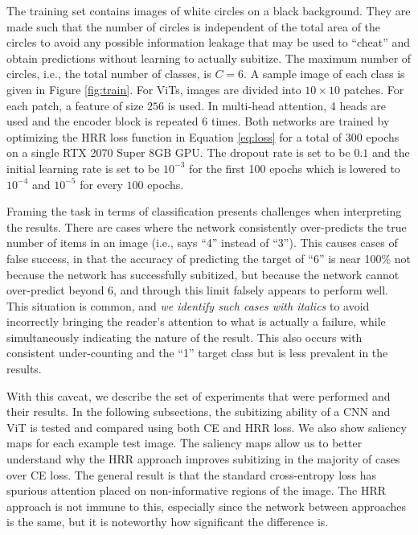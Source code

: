 \documentclass[letterpaper]{article} %
\begin{document}
The training set contains images of white circles on a black background. They are made such that the number of circles is independent of the total area of the circles to avoid any possible information leakage that may be used to ``cheat'' and obtain predictions without learning to actually subitize. The maximum number of circles, i.e., the total number of classes, is $C=6$. A sample image of each class is given in Figure \ref{fig:train}. For ViTs, images are divided into $10 \times 10$ patches. For each patch, a feature of size $256$ is used. In multi-head attention, 4 heads are used and the encoder block is repeated 6 times. Both networks are trained by optimizing the HRR loss function in Equation \ref{eq:loss} for a total of $300$ epochs on a single RTX 2070 Super 8GB GPU. The dropout rate is set to be $0.1$ and the initial learning rate is set to be $10^{-3}$ for the first 100 epochs which is lowered to $10^{-4}$ and $10^{-5}$ for every $100$ epochs.
\par 
Framing the task in terms of classification presents challenges when interpreting the results. There are cases where the network consistently over-predicts the true number of items in an image (i.e., says ``4'' instead of ``3''). This causes cases of false success, in that the accuracy of predicting the target of ``6'' is near 100\% not because the network has successfully subitized, but because the network cannot over-predict beyond 6, and through this limit falsely appears to perform well. This situation is common, and \textit{we identify such cases with italics} to avoid incorrectly bringing the reader's attention to what is actually a failure, while simultaneously indicating the nature of the result. This also occurs with consistent under-counting and the ``1'' target class but is less prevalent in the results. 
\par 
With this caveat, we describe the set of experiments that were performed and their results. In the following subsections, the subitizing ability of a CNN and ViT is tested and compared using both CE and HRR loss. We also show saliency maps \cite{saliency} for each example test image. The saliency maps allow us to better understand why the HRR approach improves subitizing in the majority of cases over CE loss. The general result is that the standard cross-entropy loss has spurious attention placed on non-informative regions of the image. The HRR approach is not immune to this, especially since the network between approaches is the same, but it is noteworthy how significant the difference is.
\end{document}
